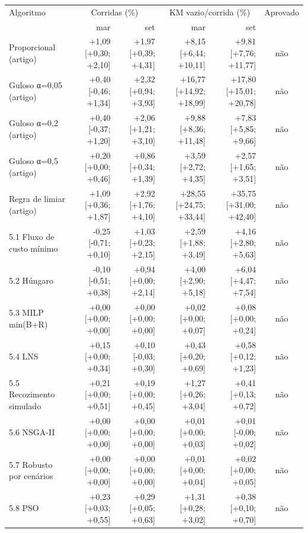 \begin{tabular}{lrrrrc}
\hline
Algoritmo & \multicolumn{2}{c}{Corridas (\%)} & \multicolumn{2}{c}{KM vazio/corrida (\%)} & Aprovado \\
 & mar & set & mar & set & \\
\hline
Proporcional (artigo) & +1{,}09 [+0{,}30; +2{,}10] & +1{,}97 [+0{,}39; +4{,}31] & +8{,}15 [+6{,}44; +10{,}11] & +9{,}81 [+7{,}76; +11{,}77] & não \\
Guloso α=0,05 (artigo) & +0{,}40 [-0{,}46; +1{,}34] & +2{,}32 [+0{,}94; +3{,}93] & +16{,}77 [+14{,}92; +18{,}99] & +17{,}80 [+15{,}01; +20{,}78] & não \\
Guloso α=0,2 (artigo) & +0{,}40 [-0{,}37; +1{,}20] & +2{,}06 [+1{,}21; +3{,}10] & +9{,}88 [+8{,}36; +11{,}48] & +7{,}83 [+5{,}85; +9{,}66] & não \\
Guloso α=0,5 (artigo) & +0{,}20 [+0{,}00; +0{,}46] & +0{,}86 [+0{,}34; +1{,}39] & +3{,}59 [+2{,}72; +4{,}35] & +2{,}57 [+1{,}65; +3{,}51] & não \\
Regra de limiar (artigo) & +1{,}09 [+0{,}36; +1{,}87] & +2{,}92 [+1{,}76; +4{,}10] & +28{,}55 [+24{,}75; +33{,}44] & +35{,}75 [+31{,}00; +42{,}40] & não \\
5.1 Fluxo de custo mínimo & -0{,}25 [-0{,}71; +0{,}10] & +1{,}03 [+0{,}23; +2{,}15] & +2{,}59 [+1{,}88; +3{,}49] & +4{,}16 [+2{,}80; +5{,}63] & não \\
5.2 Húngaro & -0{,}10 [-0{,}51; +0{,}38] & +0{,}94 [+0{,}00; +2{,}14] & +4{,}00 [+2{,}90; +5{,}18] & +6{,}04 [+4{,}47; +7{,}54] & não \\
5.3 MILP min(B+R) & +0{,}00 [+0{,}00; +0{,}00] & +0{,}00 [+0{,}00; +0{,}00] & +0{,}02 [+0{,}00; +0{,}07] & +0{,}08 [+0{,}00; +0{,}24] & não \\
5.4 LNS & +0{,}15 [+0{,}00; +0{,}34] & +0{,}10 [-0{,}03; +0{,}30] & +0{,}43 [+0{,}20; +0{,}69] & +0{,}58 [+0{,}12; +1{,}23] & não \\
5.5 Recozimento simulado & +0{,}21 [+0{,}00; +0{,}51] & +0{,}19 [+0{,}00; +0{,}45] & +1{,}27 [+0{,}26; +3{,}04] & +0{,}41 [+0{,}13; +0{,}72] & não \\
5.6 NSGA-II & +0{,}00 [+0{,}00; +0{,}00] & +0{,}00 [+0{,}00; +0{,}00] & +0{,}01 [+0{,}00; +0{,}03] & +0{,}01 [-0{,}00; +0{,}02] & não \\
5.7 Robusto por cenários & +0{,}00 [+0{,}00; +0{,}00] & +0{,}00 [+0{,}00; +0{,}00] & +0{,}01 [+0{,}00; +0{,}04] & +0{,}02 [+0{,}00; +0{,}05] & não \\
5.8 PSO & +0{,}23 [+0{,}03; +0{,}55] & +0{,}29 [+0{,}05; +0{,}63] & +1{,}31 [+0{,}28; +3{,}02] & +0{,}38 [+0{,}10; +0{,}70] & não \\
\hline
\end{tabular}
